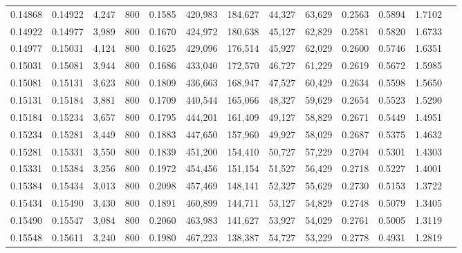 \begin{tabular}{rrrrrrrrrrrrr}
0.14868 & 0.14922 &  4,247 &   800 &                                     0.1585 & 420,983 & 184,627 &  44,327 &  63,629 & 0.2563 & 0.5894 & 1.7102 \\
0.14922 & 0.14977 &  3,989 &   800 &                                     0.1670 & 424,972 & 180,638 &  45,127 &  62,829 & 0.2581 & 0.5820 & 1.6733 \\
0.14977 & 0.15031 &  4,124 &   800 &                                     0.1625 & 429,096 & 176,514 &  45,927 &  62,029 & 0.2600 & 0.5746 & 1.6351 \\
0.15031 & 0.15081 &  3,944 &   800 &                                     0.1686 & 433,040 & 172,570 &  46,727 &  61,229 & 0.2619 & 0.5672 & 1.5985 \\
0.15081 & 0.15131 &  3,623 &   800 &                                     0.1809 & 436,663 & 168,947 &  47,527 &  60,429 & 0.2634 & 0.5598 & 1.5650 \\
0.15131 & 0.15184 &  3,881 &   800 &                                     0.1709 & 440,544 & 165,066 &  48,327 &  59,629 & 0.2654 & 0.5523 & 1.5290 \\
0.15184 & 0.15234 &  3,657 &   800 &                                     0.1795 & 444,201 & 161,409 &  49,127 &  58,829 & 0.2671 & 0.5449 & 1.4951 \\
0.15234 & 0.15281 &  3,449 &   800 &                                     0.1883 & 447,650 & 157,960 &  49,927 &  58,029 & 0.2687 & 0.5375 & 1.4632 \\
0.15281 & 0.15331 &  3,550 &   800 &                                     0.1839 & 451,200 & 154,410 &  50,727 &  57,229 & 0.2704 & 0.5301 & 1.4303 \\
0.15331 & 0.15384 &  3,256 &   800 &                                     0.1972 & 454,456 & 151,154 &  51,527 &  56,429 & 0.2718 & 0.5227 & 1.4001 \\
0.15384 & 0.15434 &  3,013 &   800 &                                     0.2098 & 457,469 & 148,141 &  52,327 &  55,629 & 0.2730 & 0.5153 & 1.3722 \\
0.15434 & 0.15490 &  3,430 &   800 &                                     0.1891 & 460,899 & 144,711 &  53,127 &  54,829 & 0.2748 & 0.5079 & 1.3405 \\
0.15490 & 0.15547 &  3,084 &   800 &                                     0.2060 & 463,983 & 141,627 &  53,927 &  54,029 & 0.2761 & 0.5005 & 1.3119 \\
0.15548 & 0.15611 &  3,240 &   800 &                                     0.1980 & 467,223 & 138,387 &  54,727 &  53,229 & 0.2778 & 0.4931 & 1.2819 \\

\end{tabular}
